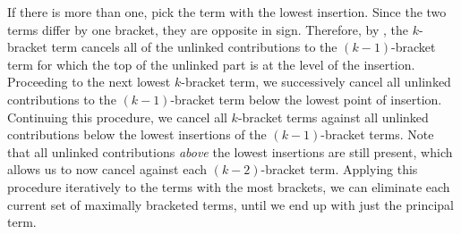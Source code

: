 \documentclass[11pt,fleqn]{article}
\numberwithin{equation}{section}
\begin{document}
\begin{thm}
{\begin{lem}
{    If there is more than one, pick the term with the lowest insertion.
    Since the two terms differ by one bracket, they are opposite in sign.
    Therefore, by , the $k$-bracket term cancels all of the unlinked contributions to the $(k-1)$-bracket term for which the top of the unlinked part is at the level of the insertion.
    Proceeding to the next lowest $k$-bracket term, we successively cancel all unlinked contributions to the $(k-1)$-bracket term below the lowest point of insertion.
    Continuing this procedure, we cancel all $k$-bracket terms against all unlinked contributions below the lowest insertions of the $(k-1)$-bracket terms.
    Note that all unlinked contributions \emph{above} the lowest insertions are still present, which allows us to now cancel against each $(k-2)$-bracket term.    
    Applying this procedure iteratively to the terms with the most brackets, we can eliminate each current set of maximally bracketed terms, until we end up with just the principal term.
  }
  \end{lem}
}
\end{thm}
\end{document}
